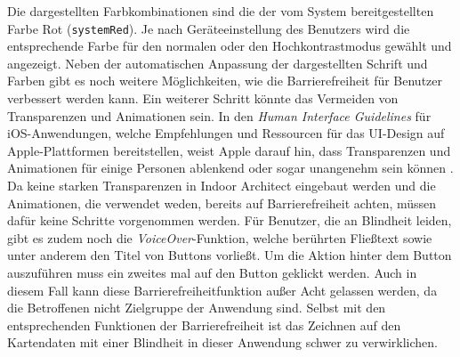 Die dargestellten Farbkombinationen sind die der vom System bereitgestellten Farbe Rot (\texttt{systemRed}).
Je nach Geräteeinstellung des Benutzers wird die entsprechende Farbe für den normalen oder den Hochkontrastmodus gewählt und angezeigt.\pbreak%
%
Neben der automatischen Anpassung der dargestellten Schrift und Farben gibt es noch weitere Möglichkeiten, wie die Barrierefreiheit für Benutzer verbessert werden kann.
Ein weiterer Schritt könnte das Vermeiden von Transparenzen und Animationen sein.
In den \emph{Human Interface Guidelines} für iOS-Anwendungen, welche Empfehlungen und Ressourcen für das UI-Design auf Apple-Plattformen bereitstellen, weist Apple darauf hin, dass Transparenzen und Animationen für einige Personen ablenkend oder sogar unangenehm sein können \parencite{APP2020a}.
Da keine starken Transparenzen in Indoor Architect eingebaut werden und die Animationen, die verwendet weden, bereits auf Barrierefreiheit achten, müssen dafür keine Schritte vorgenommen werden.
Für Benutzer, die an Blindheit leiden, gibt es zudem noch die \emph{VoiceOver}-Funktion, welche berührten Fließtext sowie unter anderem den Titel von Buttons vorließt.
Um die Aktion hinter dem Button auszuführen muss ein zweites mal auf den Button geklickt werden.
Auch in diesem Fall kann diese Barrierefreiheitfunktion außer Acht gelassen werden, da die Betroffenen nicht Zielgruppe der Anwendung sind.
Selbst mit den entsprechenden Funktionen der Barrierefreiheit ist das Zeichnen auf den Kartendaten mit einer Blindheit in dieser Anwendung schwer zu verwirklichen.

